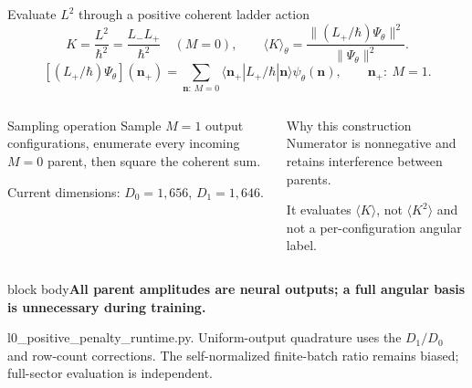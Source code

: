 \documentclass[aspectratio=169,10pt]{beamer}
\newcommand{\src}[1]{\vfill{\fontsize{6.3}{7.5}\selectfont\color{muted}#1\par}}
\newcommand{\take}[1]{\vspace{1mm}\begin{beamercolorbox}[sep=1.6mm,wd=\textwidth]{block body}\small\color{teal}\textbf{#1}\end{beamercolorbox}}
\newcommand{\nn}{\mathbf n}
\begin{document}
\begin{frame}{Evaluate $L^2$ through a positive coherent ladder action}
\[
K=\frac{L^2}{\hbar^2}
=\frac{L_-L_+}{\hbar^2}\quad(M=0),\qquad
\langle K\rangle_\theta
=\frac{\| (L_+/\hbar)\Psi_\theta\|^2}{\|\Psi_\theta\|^2}.
\]
\[
\left[(L_+/\hbar)\Psi_\theta\right](\nn_+)
=\sum_{\nn:\,M=0}\langle\nn_+|L_+/\hbar|\nn\rangle\psi_\theta(\nn),
\qquad \nn_+:\ M=1.
\]
\begin{columns}[T,onlytextwidth]
\begin{block}{Sampling operation}
Sample $M=1$ output configurations, enumerate every incoming $M=0$ parent, then square the coherent sum.\par\smallskip
Current dimensions: $D_0=1,656$, $D_1=1,646$.
\end{block}
\begin{block}{Why this construction}
Numerator is nonnegative and retains interference between parents.\par\smallskip
It evaluates $\langle K\rangle$, not $\langle K^2\rangle$ and not a per-configuration angular label.
\end{block}
\end{columns}
\take{All parent amplitudes are neural outputs; a full angular basis is unnecessary during training.}
\src{l0\_positive\_penalty\_runtime.py. Uniform-output quadrature uses the $D_1/D_0$ and row-count corrections. The self-normalized finite-batch ratio remains biased; full-sector evaluation is independent.}
\end{frame}
\end{document}
